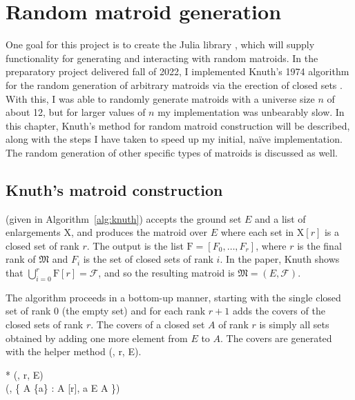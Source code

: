 \chapter{Random matroid generation}

One goal for this project is to create the Julia library , which will supply functionality for generating and interacting with random matroids. In the preparatory project delivered fall of 2022, I implemented Knuth's 1974 algorithm for the random generation of arbitrary matroids via the erection of closed sets \cite{knuth-1975}. With this, I was able to randomly generate matroids with a universe size $n$ of about 12, but for larger values of $n$ my implementation was unbearably slow. In this chapter, Knuth's method for random matroid construction will be described, along with the steps I have taken to speed up my initial, naïve implementation. The random generation of other specific types of matroids is discussed as well.

\section{Knuth's matroid construction}
 (given in Algorithm~\ref{alg:knuth}) accepts the ground set $E$ and a list of enlargements $\mathrm{X}$, and produces the matroid over $E$ where each set in $\mathrm{X}[r]$ is a closed set of rank $r$. The output is the list $\mathrm{F} = [F_0, \ldots, F_r]$, where $r$ is the final rank of $\mathfrak{M}$ and $F_i$ is the set of closed sets of rank $i$. In the paper, Knuth shows that $\bigcup_{i=0}^r \mathrm{F}[r] = \mathcal{F}$, and so the resulting matroid is $\mathfrak{M} = (E, \mathcal{F})$.

The algorithm proceeds in a bottom-up manner, starting with the single closed set of rank 0 (the empty set) and for each rank $r+1$ adds the covers of the closed sets of rank $r$. The covers of a closed set $A$ of rank $r$ is simply all sets obtained by adding one more element from $E$ to $A$. The covers are generated with the helper method (, r, E).

\begin{tcolorbox}[pseudo/filled, colback=lighttan]
  \begin{pseudo}*
    (, r, E) \\
    (, \{ A \cup \{a\} : A \in {}[r], a \in E \setminus A \})
  \end{pseudo}
\end{tcolorbox}

